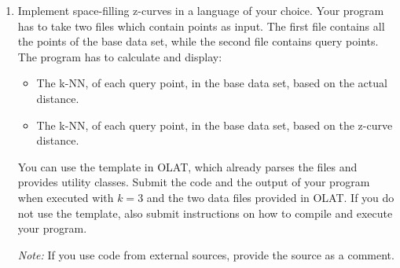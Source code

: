 


\newcommand{\subtitle}{\textbf{Exercise 7}}
\newcommand{\outdate}{04.12.2023}
\newcommand{\duedate}{11.12.2023 12:00 MEZ}
\newcommand{\video}{036}

\usepackage{tkz-euclide}




\begin{enumerate}
  \item 
  Implement space-filling z-curves in a language of your choice.
Your program has to take two files which contain points as input.
The first file contains all the points of the base data set, while the second file contains query points.
The program has to calculate and display:
\begin{itemize}
\item The k-NN, of each query point, in the base data set, based on the actual distance.
\item The k-NN, of each query point, in the base data set, based on the z-curve distance.
\end{itemize}

You can use the template in OLAT, which already parses the files and provides utility classes.
Submit the code and the output of your program when executed with $k = 3$ and the two data files provided in OLAT.
If you do not use the template, also submit instructions on how to compile and execute your program.

\textit{Note: } If you use code from external sources, provide the source as a comment.\\


\end{enumerate}
